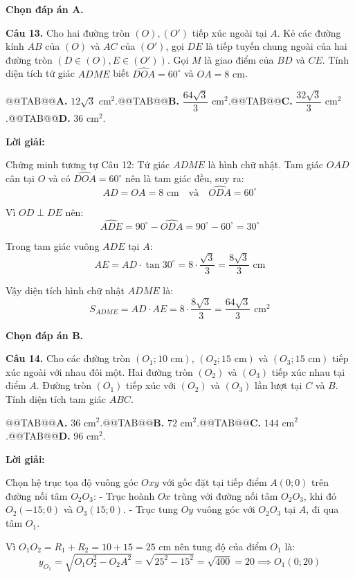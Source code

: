 \documentclass[11pt,a4paper]{article}
\begin{document}
\textbf{Chọn đáp án A.}

\textbf{Câu 13.} Cho hai đường tròn $(O), (O')$ tiếp xúc ngoài tại $A$. Kẻ các đường kính $AB$ của $(O)$ và $AC$ của $(O')$, gọi $DE$ là tiếp tuyến chung ngoài của hai đường tròn $(D \in (O), E \in (O'))$. Gọi $M$ là giao điểm của $BD$ và $CE$. Tính diện tích tứ giác $ADME$ biết $\widehat{DOA} = 60^\circ$ và $OA = 8\text{ cm}$.

@@TAB@@\textbf{A.} $12\sqrt{3}\text{ cm}^2$.@@TAB@@\textbf{B.} $\dfrac{64\sqrt{3}}{3}\text{ cm}^2$.@@TAB@@\textbf{C.} $\dfrac{32\sqrt{3}}{3}\text{ cm}^2$.@@TAB@@\textbf{D.} $36\text{ cm}^2$.

\textbf{Lời giải:}

Chứng minh tương tự Câu 12:
Tứ giác $ADME$ là hình chữ nhật.
Tam giác $OAD$ cân tại $O$ và có $\widehat{DOA} = 60^\circ$ nên là tam giác đều, suy ra:
\[AD = OA = 8\text{ cm} \quad \text{và} \quad \widehat{ODA} = 60^\circ\]

Vì $OD \perp DE$ nên:
\[\widehat{ADE} = 90^\circ - \widehat{ODA} = 90^\circ - 60^\circ = 30^\circ\]

Trong tam giác vuông $ADE$ tại $A$:
\[AE = AD \cdot \tan 30^\circ = 8 \cdot \dfrac{\sqrt{3}}{3} = \dfrac{8\sqrt{3}}{3}\text{ cm}\]

Vậy diện tích hình chữ nhật $ADME$ là:
\[S_{ADME} = AD \cdot AE = 8 \cdot \dfrac{8\sqrt{3}}{3} = \dfrac{64\sqrt{3}}{3}\text{ cm}^2\]

\textbf{Chọn đáp án B.}

\textbf{Câu 14.} Cho các đường tròn $(O_1; 10\text{ cm})$, $(O_2; 15\text{ cm})$ và $(O_3; 15\text{ cm})$ tiếp xúc ngoài với nhau đôi một. Hai đường tròn $(O_2)$ và $(O_3)$ tiếp xúc nhau tại điểm $A$. Đường tròn $(O_1)$ tiếp xúc với $(O_2)$ và $(O_3)$ lần lượt tại $C$ và $B$. Tính diện tích tam giác $ABC$.

@@TAB@@\textbf{A.} $36\text{ cm}^2$.@@TAB@@\textbf{B.} $72\text{ cm}^2$.@@TAB@@\textbf{C.} $144\text{ cm}^2$.@@TAB@@\textbf{D.} $96\text{ cm}^2$.

\textbf{Lời giải:}

Chọn hệ trục tọa độ vuông góc $Oxy$ với gốc đặt tại tiếp điểm $A(0; 0)$ trên đường nối tâm $O_2O_3$:
- Trục hoành $Ox$ trùng với đường nối tâm $O_2O_3$, khi đó $O_2(-15; 0)$ và $O_3(15; 0)$.
- Trục tung $Oy$ vuông góc với $O_2O_3$ tại $A$, đi qua tâm $O_1$.

Vì $O_1O_2 = R_1 + R_2 = 10 + 15 = 25\text{ cm}$ nên tung độ của điểm $O_1$ là:
\[y_{O_1} = \sqrt{O_1O_2^2 - O_2A^2} = \sqrt{25^2 - 15^2} = \sqrt{400} = 20 \implies O_1(0; 20)\]
\end{document}
